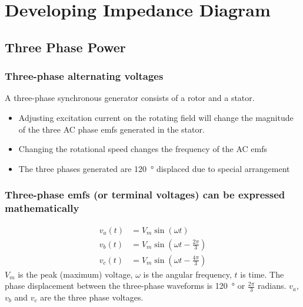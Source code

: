 \chapter{Developing Impedance Diagram}
\section{Three Phase Power}
\subsection{Three-phase alternating voltages}
A three-phase synchronous generator consists of a rotor and a stator.
\begin{itemize}
	\item Adjusting excitation current on the rotating field will change the magnitude of the three AC phase emfs generated in the stator.
	\item Changing the rotational speed changes the frequency of the AC emfs
	\item The three phases generated are \SI{120}{\degree} displaced due to special arrangement
\end{itemize}
\subsection{Three-phase emfs (or terminal voltages) can be expressed mathematically}
\begin{align}
	v_a\left( t\right) & = V_m \sin\left( \omega t\right)                  \\
	v_b\left( t\right) & = V_m \sin\left( \omega t - \frac{2\pi}{3}\right) \\
	v_c\left( t\right) & = V_m \sin\left( \omega t - \frac{4\pi}{3}\right)
\end{align}
$V_m$ is the peak (maximum) voltage, $\omega$ is the angular frequency, $t$ is time. The phase displacement between the three-phase waveforms is \SI{120}{\degree} or $\frac{2\pi}{3}$ radians. $v_a$, $v_b$ and $v_c$ are the three phase voltages.
